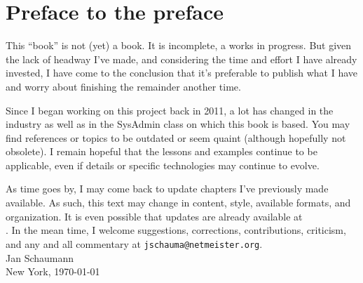 \chapter{Preface to the preface}

This ``book'' is not (yet) a book.  It is incomplete,
a works in progress.  But given the lack of headway
I've made, and considering the time and effort I have
already invested, I have come to the conclusion that
it's preferable to publish what I have and worry about
finishing the remainder another time.

Since I began working on this project back in 2011, a
lot has changed in the industry as well as in the
SysAdmin class on which this book is based.  You may
find references or topics to be outdated or seem
quaint (although hopefully not obsolete).  I remain
hopeful that the lessons and examples continue to be
applicable, even if details or specific technologies
may continue to evolve.

As time goes by, I may come back to update chapters
I've previously made available.  As such, this text
may change in content, style, available formats, and
organization.  It is even possible that updates are
already available at \\
.
In the mean time, I welcome suggestions, corrections,
contributions, criticism, and any and all commentary at
{\tt jschauma@netmeister.org}.  \\

\noindent
Jan Schaumann \\
New York, 
\today
